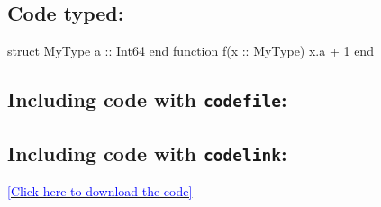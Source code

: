 \documentclass[10pt,a4paper]{article}
\newcommand{\codefile}[1]{}
\newcommand{\codelink}[1]{
            \begin{center}
            \href{http://www.mycodes.com/#1}
                 {\textcolor{blue}{[Click here to download the code]}}
            \end{center}}
\begin{document}
\subsection*{Code typed:}

\begin{code}
struct MyType
  a :: Int64
end
function f(x :: MyType)
  x.a + 1
end
\end{code}

\subsection*{Including code with {\tt codefile}:}

\codefile{./example.jl}

\subsection*{Including code with {\tt codelink}:}

\codelink{./example.jl}
\end{document}
